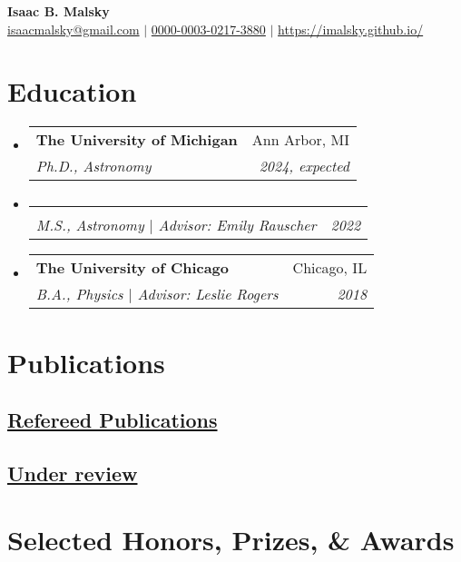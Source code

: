 \documentclass[letterpaper,11pt]{article}
\makeatletter
\newcommand{\resumeSubheading}[4]{
  \vspace{-1pt}\item[]
  \begin{tabular*}{0.98\textwidth}{l@{\extracolsep{\fill}}r}
      \hspace{-10pt}\textbf{#1} & #2 \\
      \hspace{-10pt}\textit{\small#3} & \textit{\small #4} \\
    \end{tabular*}\vspace{-5pt}
}
\newcommand{\resumeSubHeadingListStart}{\begin{itemize}[leftmargin=*]}
\newcommand{\resumeSubHeadingListEnd}{\end{itemize}}
\newcommand{\shorterSection}[1]{\vspace{-10pt}\section{#1}}
\newcommand{\shortershorterSection}[1]{\vspace{-10pt}\subsection{#1}}
\makeatother
\begin{document}
\thispagestyle{empty}















\begin{center}
  \small \textbf{\large Isaac B. Malsky} \\
  \textsf{\small \href{href="mailto:isaacmalsky@gmail.com"}{isaacmalsky@gmail.com}} $\vert$   \href{https://orcid.org/0000-0003-0217-3880/}{0000-0003-0217-3880} $\vert$ \href{https://imalsky.github.io/}{https://imalsky.github.io/}
\end{center}
\vspace{-20pt}


\shorterSection{Education}
  \resumeSubHeadingListStart
    \resumeSubheading
      {The University of Michigan}{Ann Arbor, MI}
      {Ph.D., Astronomy}{2024, expected}{
    }
    \vspace{-37pt}
    \resumeSubheading
    {}{}{M.S., Astronomy $\vert$ Advisor: Emily Rauscher}{2022}{
    }
    \vspace{-20pt}
    \resumeSubheading
      {The University of Chicago}{Chicago, IL}
      {B.A., Physics $\vert$ Advisor: Leslie Rogers}{2018}{
    }
  \resumeSubHeadingListEnd
\vspace{-12pt}















\shorterSection{Publications}

\shortershorterSection{\underline{Refereed Publications}}
\small
\begin{list}{}{\cvlist}
    
  \end{list}

\shortershorterSection{\underline{Under review}}
\small
\begin{list}{}{\cvlist}
    
    
\end{list}

\shorterSection{Selected Honors, Prizes, \& Awards}
\small
  \begin{list}{}{\cvlist}
    
\end{list}
\end{document}
